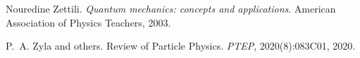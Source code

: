 
\begin{DoxyDescription}
\item[\label{citelist_CITEREF_zettili2003quantum}%
\Hypertarget{citelist_CITEREF_zettili2003quantum}%
\mbox{[}1\mbox{]}]Nouredine Zettili. {\itshape Quantum mechanics\+: concepts and applications}. American Association of Physics Teachers, 2003.


\item[\label{citelist_CITEREF_ParticleDataGroup:2020ssz}%
\Hypertarget{citelist_CITEREF_ParticleDataGroup:2020ssz}%
\mbox{[}2\mbox{]}]P.~A. Zyla and others. Review of Particle Physics. {\itshape PTEP}, 2020(8)\+:083C01, 2020. 


\end{DoxyDescription}